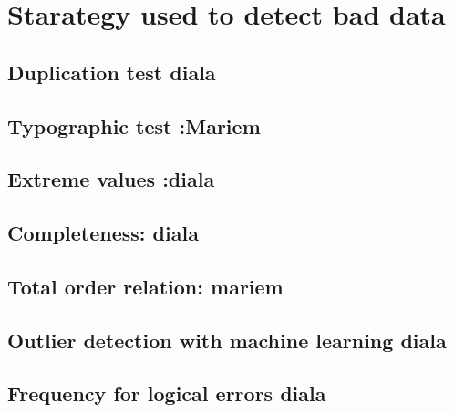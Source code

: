 \documentclass{article}
\begin{document}

\section{Starategy used to detect bad data} %
\label{sec:Starategy used to detect bad data}



\subsection{Duplication test diala} %
\label{sub:Duplication test}





\subsection{Typographic test :Mariem} %
\label{sub:Typographic test}


\subsection{Extreme values :diala} %
\label{sub:Extreme values}


\subsection{Completeness: diala} %
\label{sub:Completeness}


\subsection{Total order relation: mariem} %
\label{sub:Total order relation}


\subsection{Outlier detection with machine learning diala} %
\label{sub:Outlier detection with machine learning}

\subsection{Frequency for logical errors diala} %
\label{sub:Frequency for logical errors}
\end{document}
